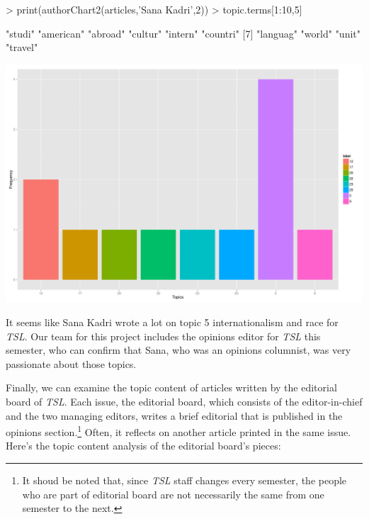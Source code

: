 \documentclass[a4paper]{article}
\begin{document}
\begin{Schunk}
\begin{Sinput}
> print(authorChart2(articles,'Sana Kadri',2))
> topic.terms[1:10,5]
\end{Sinput}
\begin{Soutput}
 [1] "studi"    "american" "abroad"   "cultur"   "intern"   "countri" 
 [7] "languag"  "world"    "unit"     "travel"  
\end{Soutput}
\end{Schunk}
\includegraphics{FinalProject-011}

It seems like Sana Kadri wrote a lot on topic 5 internationalism and race for \textit{TSL}. Our team for this project includes the opinions editor for \textit{TSL} this semester, who can confirm that Sana, who was an opinions columnist, was very passionate about those topics.

Finally, we can examine the topic content of articles written by the editorial board of \textit{TSL}. Each issue, the editorial board, which consists of the editor-in-chief and the two managing editors, writes a brief editorial that is published in the opinions section.\footnote{It shoud be noted that, since \textit{TSL} staff changes every semester, the people who are part of editorial board are not necessarily the same from one semester to the next.} Often, it reflects on another article printed in the same issue. Here's the topic content analysis of the editorial board's pieces:
\end{document}
